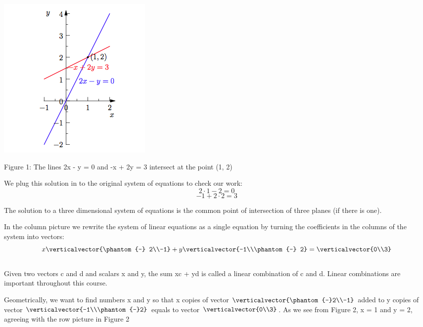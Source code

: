 \documentclass{ximera}
\begin{document}
\begin{center}
\includegraphics{Geometry1.png}

Figure 1: The lines 2x - y = 0 and -x + 2y = 3 intersect at the point (1, 2)
\end{center}

\noindent
We plug this solution in to the original system of equations to check our work:\\

\[2\cdot1-2 = 0\]
\[-1+2\cdot2 = 3\]

The solution to a three dimensional system of equations is the common point of intersection of three planes (if there is one).

\noindent
In the column picture we rewrite the system of linear equations as a single equation by turning the coefficients in the columns of the system into vectors:\\

\[x\verticalvector{\phantom{-} 2\\-1} + y\verticalvector{-1\\\phantom{-} 2} = \verticalvector{0\\3}\]\\

Given two vectors c and d and scalars x and y, the sum xc + yd is called a linear combination of c and d. Linear combinations are important throughout this course.

\noindent
Geometrically, we want to find numbers x and y so that x copies of vector $\verticalvector{\phantom{-}2\\-1}$ added to y copies of vector $\verticalvector{-1\\\phantom{-}2}$ equals to vector $\verticalvector{0\\3}$. As we see from Figure 2, x = 1 and y = 2, agreeing with the row picture in Figure 2
\end{document}
